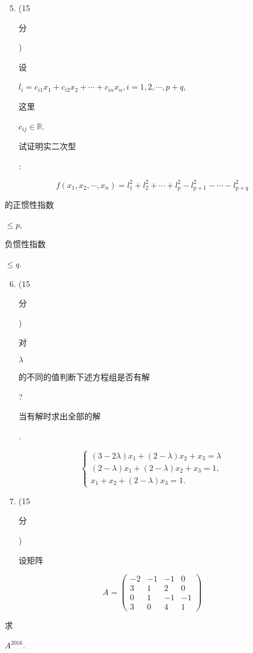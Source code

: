 \documentclass[10pt]{article}
\begin{document}
\begin{enumerate}
  \setcounter{enumi}{4}
  \item (15 \begin{CJK}{UTF8}{mj}分\end{CJK}) \begin{CJK}{UTF8}{mj}设\end{CJK} $l_{i}=c_{i 1} x_{1}+c_{i 2} x_{2}+\cdots+c_{i n} x_{n}, i=1,2, \cdots, p+q$, \begin{CJK}{UTF8}{mj}这里\end{CJK} $c_{i j} \in \mathbb{R}$. \begin{CJK}{UTF8}{mj}试证明实二次型\end{CJK}:
\end{enumerate}
$$
f\left(x_{1}, x_{2}, \cdots, x_{n}\right)=l_{1}^{2}+l_{2}^{2}+\cdots+l_{p}^{2}-l_{p+1}^{2}-\cdots-l_{p+q}^{2}
$$
\begin{CJK}{UTF8}{mj}的正惯性指数\end{CJK} $\leq p$, \begin{CJK}{UTF8}{mj}负惯性指数\end{CJK} $\leq q$.

\begin{enumerate}
  \setcounter{enumi}{5}
  \item (15 \begin{CJK}{UTF8}{mj}分\end{CJK}) \begin{CJK}{UTF8}{mj}对\end{CJK} $\lambda$ \begin{CJK}{UTF8}{mj}的不同的值判断下述方程组是否有解\end{CJK}? \begin{CJK}{UTF8}{mj}当有解时求出全部的解\end{CJK}.
\end{enumerate}
$$
\left\{\begin{array}{l}
(3-2 \lambda) x_{1}+(2-\lambda) x_{2}+x_{3}=\lambda \\
(2-\lambda) x_{1}+(2-\lambda) x_{2}+x_{3}=1, \\
x_{1}+x_{2}+(2-\lambda) x_{3}=1 .
\end{array}\right.
$$

\begin{enumerate}
  \setcounter{enumi}{6}
  \item (15 \begin{CJK}{UTF8}{mj}分\end{CJK}) \begin{CJK}{UTF8}{mj}设矩阵\end{CJK}
\end{enumerate}
$$
A=\left(\begin{array}{cccc}
-2 & -1 & -1 & 0 \\
3 & 1 & 2 & 0 \\
0 & 1 & -1 & -1 \\
3 & 0 & 4 & 1
\end{array}\right)
$$
\begin{CJK}{UTF8}{mj}求\end{CJK} $A^{2016}$.
\end{document}
